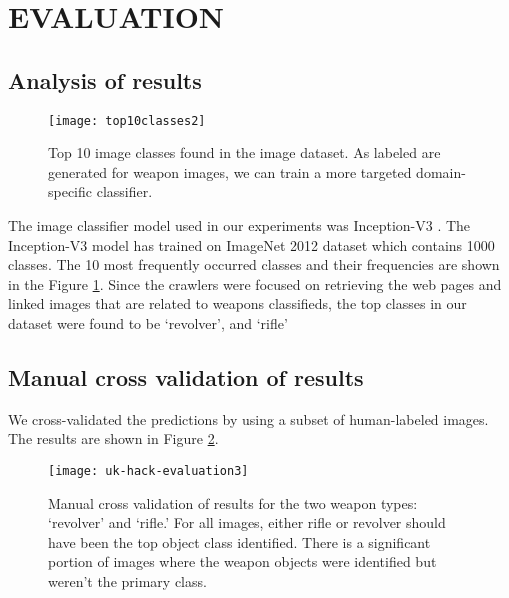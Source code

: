 \section {EVALUATION} \label{sec:evaluation}

\subsection{Analysis of results}
\begin{figure}[h]
	\texttt{[image: top10classes2]}
	\caption{Top 10 image classes found in the image dataset. As labeled are generated for weapon images, we can train a more targeted domain-specific classifier.}
	\label{fig:top10ImgClass}
\end{figure}
The image classifier model used in our experiments was Inception-V3 \cite{SzegedyVISW15}. The Inception-V3 model has trained on ImageNet 2012 dataset which contains 1000 classes\cite{ILSVRC15}.
The 10 most frequently occurred classes and their frequencies are shown in the Figure \ref{fig:top10ImgClass}. Since the crawlers were focused on retrieving the web pages and linked images that are related to weapons classifieds, the top classes in our dataset were found to be `revolver', and `rifle'

\subsection{Manual cross validation of results}
We cross-validated the predictions by using a subset of human-labeled images. The results are shown in Figure \ref{fig:uk-hack-eval}. 
\begin{figure}[h]
	\texttt{[image: uk-hack-evaluation3]}
	\caption{Manual cross validation of results for the two weapon types: `revolver' and `rifle.' For all images, either rifle or revolver should have been the top object class identified. There is a significant portion of images where the weapon objects were identified but weren't the primary class.}
	\label{fig:uk-hack-eval}
\end{figure}

